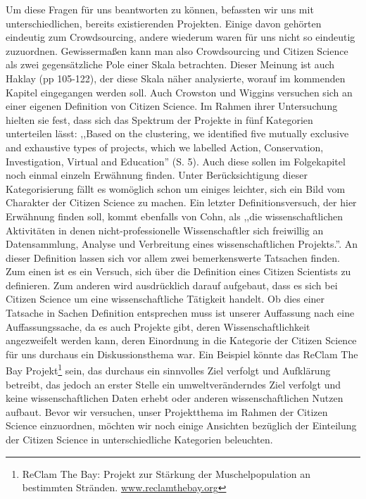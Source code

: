 \documentclass{article}
\begin{document}
Um diese Fragen für uns beantworten zu können, befassten wir uns mit unterschiedlichen, bereits existierenden Projekten.
Einige davon gehörten eindeutig zum Crowdsourcing, andere wiederum waren für uns nicht so eindeutig zuzuordnen.
Gewissermaßen kann man also Crowdsourcing und Citizen Science als zwei gegensätzliche Pole einer Skala betrachten.
Dieser Meinung ist auch Haklay\cite{Haklay} (pp 105-122), der diese Skala näher analysierte, worauf im kommenden Kapitel eingegangen werden soll.
\newline
Auch Crowston und Wiggins\cite{CW} versuchen sich an einer eigenen Definition von Citizen Science.
Im Rahmen ihrer Untersuchung hielten sie fest, dass sich das Spektrum der Projekte in fünf Kategorien unterteilen lässt:
,,Based on the clustering, we identified five mutually exclusive and exhaustive types of projects,
which we labelled Action, Conservation, Investigation, Virtual and Education'' (S. 5).
Auch diese sollen im Folgekapitel noch einmal einzeln Erwähnung finden.
Unter Berücksichtigung dieser Kategorisierung fällt es womöglich schon um einiges leichter,
sich ein Bild vom Charakter der Citizen Science zu machen.
Ein letzter Definitionsversuch, der hier Erwähnung finden soll, kommt ebenfalls von Cohn,
als ,,die wissenschaftlichen Aktivitäten in denen nicht-professionelle Wissenschaftler sich freiwillig an Datensammlung,
Analyse und Verbreitung eines wissenschaftlichen Projekts.''\cite{Cohn}.%
An dieser Definition lassen sich vor allem zwei bemerkenswerte Tatsachen finden. Zum einen ist es ein Versuch,
sich über die Definition eines Citizen Scientists zu definieren. Zum anderen wird ausdrücklich darauf aufgebaut,
dass es sich bei Citizen Science um eine wissenschaftliche Tätigkeit handelt.
Ob dies einer Tatsache in Sachen Definition entsprechen muss ist unserer Auffassung nach eine Auffassungssache,
da es auch Projekte gibt, deren Wissenschaftlichkeit angezweifelt werden kann,
deren Einordnung in die Kategorie der Citizen Science für uns durchaus ein Diskussionsthema war.
Ein Beispiel könnte das ReClam The Bay Projekt\footnote{ReClam The Bay: Projekt zur Stärkung der Muschelpopulation an bestimmten Stränden.
\url{www.reclamthebay.org}} sein, das durchaus ein sinnvolles Ziel verfolgt und Aufklärung betreibt,%
das jedoch an erster Stelle ein umweltveränderndes Ziel verfolgt und keine wissenschaftlichen Daten erhebt oder anderen wissenschaftlichen Nutzen aufbaut.
\newline
Bevor wir versuchen, unser Projektthema im Rahmen der Citizen Science einzuordnen,
möchten wir noch einige Ansichten bezüglich der Einteilung der Citizen Science in unterschiedliche Kategorien beleuchten.
\end{document}
